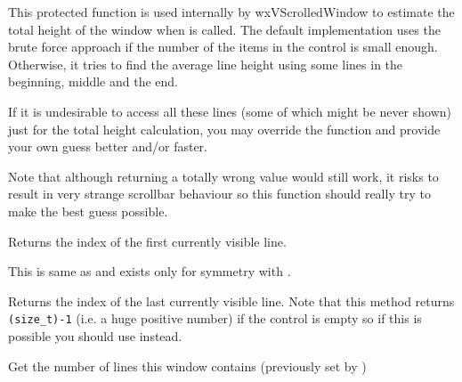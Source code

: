 
This protected function is used internally by wxVScrolledWindow to estimate the
total height of the window when  
is called. The default implementation uses the brute force approach if the
number of the items in the control is small enough. Otherwise, it tries to find
the average line height using some lines in the beginning, middle and the end.

If it is undesirable to access all these lines (some of which might be never
shown) just for the total height calculation, you may override the function and
provide your own guess better and/or faster.

Note that although returning a totally wrong value would still work, it risks
to result in very strange scrollbar behaviour so this function should really
try to make the best guess possible.


\label{wxvscrolledwindowgetfirstvisibleline}


Returns the index of the first currently visible line.

This is same as  and
exists only for symmetry with .


\label{wxvscrolledwindowgetlastvisibleline}


Returns the index of the last currently visible line. Note that this method
returns \texttt{(size\_t)-1} (i.e. a huge positive number) if the control is
empty so if this is possible you should use  
instead.




\label{wxvscrolledwindowgetlinecount}


Get the number of lines this window contains (previously set by 
)


